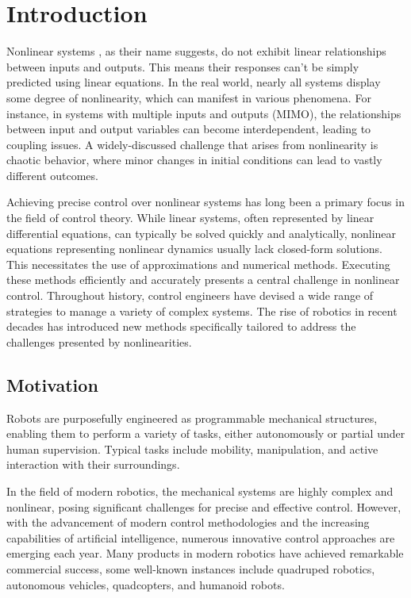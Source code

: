 \chapter{Introduction}
Nonlinear systems\cite{sastry2013nonlinear} \cite{iqbal2017nonlinear}, as their name suggests, do not exhibit linear relationships between inputs and outputs. This means their responses can't be simply predicted using linear equations. In the real world, nearly all systems display some degree of nonlinearity, which can manifest in various phenomena. For instance, in systems with multiple inputs and outputs (MIMO), the relationships between input and output variables can become interdependent, leading to coupling issues. A widely-discussed challenge that arises from nonlinearity is chaotic behavior\cite{ditto1995principles}\cite{oestreicher2007history}, where minor changes in initial conditions can lead to vastly different outcomes. 

Achieving precise control over nonlinear systems has long been a primary focus in the field of control theory. While linear systems, often represented by linear differential equations, can typically be solved quickly and analytically, nonlinear equations representing nonlinear dynamics usually lack closed-form solutions\cite{struble2018nonlinear}. This necessitates the use of approximations and numerical methods. Executing these methods efficiently and accurately presents a central challenge in nonlinear control. Throughout history, control engineers have devised a wide range of strategies to manage a variety of complex systems. The rise of robotics in recent decades has introduced new methods specifically tailored to address the challenges presented by nonlinearities.

\section{Motivation}
Robots are purposefully engineered as programmable mechanical structures, enabling them to perform a variety of tasks, either autonomously or partial under human supervision. Typical tasks include mobility, manipulation, and active interaction with their surroundings.

In the field of modern robotics, the mechanical systems are highly complex and nonlinear, posing significant challenges for precise and effective control. However, with the advancement of modern control methodologies and the increasing capabilities of artificial intelligence, numerous innovative control approaches are emerging each year. Many products in modern robotics have achieved remarkable commercial success, some well-known instances include quadruped robotics\cite{biswal2021development}, autonomous vehicles\cite{schwarting2018planning}, quadcopters\cite{luukkonen2011modelling}, and humanoid robots\cite{saeedvand2019comprehensive}.

